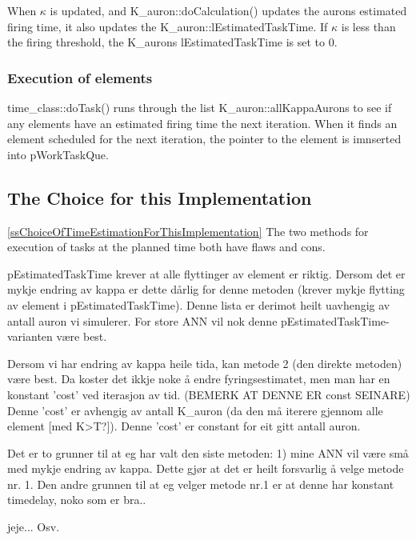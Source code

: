 	When $\kappa$ is updated, and K\_auron::doCalculation() updates the aurons estimated firing time, it also updates the K\_auron::lEstimatedTaskTime.
	If $\kappa$ is less than the firing threshold, the K\_aurons lEstimatedTaskTime is set to 0. 

	\subsubsection{Execution of elements}
	time\_class::doTask() runs through the list K\_auron::allKappaAurons to see if any elements have an estimated firing time the next iteration.
	When it finds an element scheduled for the next iteration, the pointer to the element is imnserted into pWorkTaskQue.


	\subsection{The Choice for this Implementation}
	\ref{ssChoiceOfTimeEstimationForThisImplementation}
	The two methods for execution of tasks at the planned time both have flaws and cons.
	
	pEstimatedTaskTime krever at alle flyttinger av element er riktig. Dersom det er mykje endring av kappa er dette dårlig for denne metoden (krever mykje flytting av element i pEstimatedTaskTime).
	Denne lista er derimot heilt uavhengig av antall auron vi simulerer. For store ANN vil nok denne pEstimatedTaskTime-varianten være best.

	Dersom vi har endring av kappa heile tida, kan metode 2 (den direkte metoden) være best.
	Da koster det ikkje noke å endre fyringsestimatet, men man har en konstant 'cost' ved iterasjon av tid. (BEMERK AT DENNE ER const SEINARE)
	Denne 'cost' er avhengig av antall K\_auron (da den må iterere gjennom alle element [med K>T?]). Denne 'cost' er constant for eit gitt antall auron.

	Det er to grunner til at eg har valt den siste metoden: 1) mine ANN vil være små med mykje endring av kappa. Dette gjør at det er heilt forsvarlig å velge metode nr. 1.
	Den andre grunnen til at eg velger metode nr.1 er at denne har konstant timedelay, noko som er bra..

	jeje... Osv.

